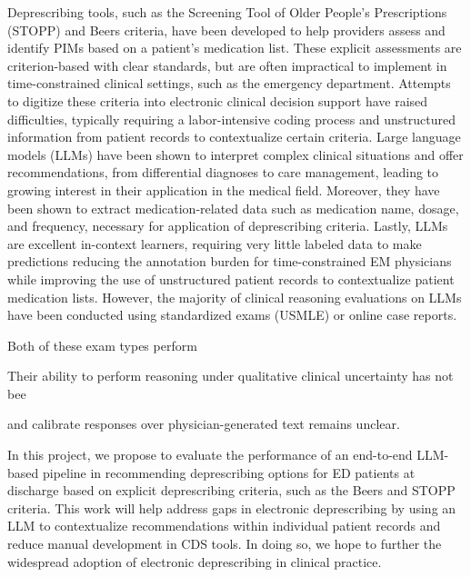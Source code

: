 Deprescribing tools, such as the Screening Tool of Older People’s Prescriptions (STOPP) and Beers criteria, have been developed to help providers assess and identify PIMs based on a patient’s medication list\citep{candeiasPotentiallyInappropriateMedications2021,bythe2023americangeriatricssocietybeerscriteriarupdateexpertpanelAmericanGeriatricsSociety2023,kaufmannInappropriatePrescribingSystematic2014}. These explicit assessments are criterion-based with clear standards, but are often impractical to implement in time-constrained clinical settings, such as the emergency department\citep{leeChallengesOpportunitiesCreating2022}. Attempts to digitize these criteria into electronic clinical decision support have raised difficulties, typically requiring a labor-intensive coding process and unstructured information from patient records to contextualize certain criteria\citep{anrysSTOPPSTARTVersion2016b,scottUsingEMRenabledComputerized2018}. Large language models (LLMs) have been shown to interpret complex clinical situations and offer recommendations, from differential diagnoses to care management, leading to growing interest in their application in the medical field\citep{clusmannFutureLandscapeLarge2023, gilsonHowDoesChatGPT2023, kungPerformanceChatGPTUSMLE2023, savageDiagnosticReasoningPrompts2024}. Moreover, they have been shown to extract medication-related data such as medication name, dosage, and frequency, necessary for application of deprescribing criteria\citep{goelLLMsAccelerateAnnotation2023}. Lastly, LLMs are excellent in-context learners, requiring very little labeled data to make predictions\citep{agrawal-etal-2022-large} reducing the annotation burden for time-constrained EM physicians while improving the use of unstructured patient records to contextualize patient medication lists. However, the majority of clinical reasoning evaluations on LLMs have been conducted using standardized exams (USMLE) or online case reports\citep{savageDiagnosticReasoningPrompts2024, savageLargeLanguageModel2024}. 

Both of these exam types perform 

Their ability to perform reasoning under qualitative clinical uncertainty has not bee

and calibrate responses over physician-generated text remains unclear. 

In this project, we propose to evaluate the performance of an end-to-end LLM-based pipeline in recommending deprescribing options for ED patients at discharge based on explicit deprescribing criteria, such as the Beers and STOPP criteria. This work will help address gaps in electronic deprescribing by using an LLM to contextualize recommendations within individual patient records and reduce manual development in CDS tools. In doing so, we hope to further the widespread adoption of electronic deprescribing in clinical practice.

